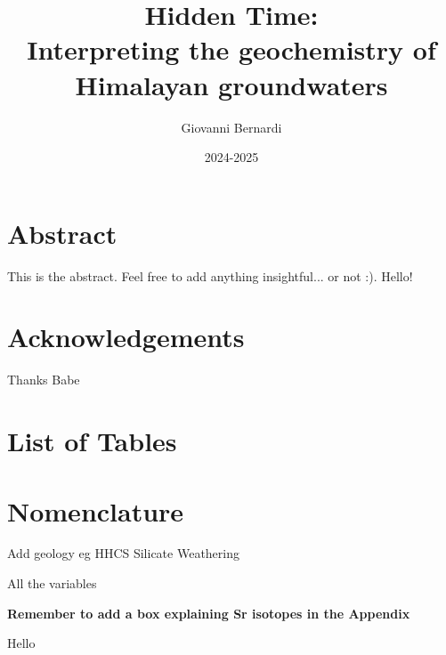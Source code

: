 \documentclass[hidelinks, 12pt]{article} %
\title{
  \vspace{-1cm}
  \textbf{Hidden Time:\\
  Interpreting the geochemistry of Himalayan groundwaters}
  \vspace{0.5cm}
}
\author{Giovanni Bernardi}
\date{2024-2025}
\begin{document}

\maketitle





\thispagestyle{empty}

\newpage

\section*{Abstract}
\label{sec:abstract}

This is the abstract. Feel free to add anything insightful... or not :). Hello!



\newpage


\thispagestyle{empty}

\tableofcontents

\newpage

\thispagestyle{empty}

\section*{Acknowledgements}

Thanks Babe

\newpage

\thispagestyle{empty}

\section*{List of Tables}

\newpage

\thispagestyle{empty}

\section*{Nomenclature}

Add geology eg HHCS
Silicate Weathering 

All the variables

\newpage




\FloatBarrier
{}





\newpage




\newpage





\newpage





\newpage





\newpage






\textbf{Remember to add a box explaining Sr isotopes in the Appendix}

Hello
\end{document}
